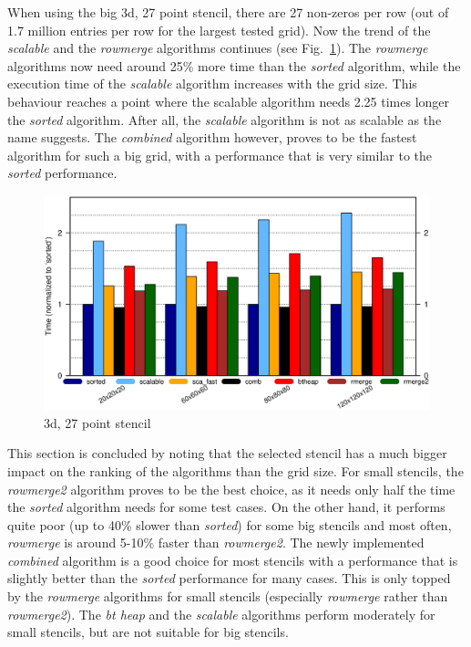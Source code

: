 When using the big 3d, 27 point stencil, there are 27 non-zeros per row (out of 1.7 million entries per row for the largest tested grid). Now the trend of the \textit{scalable} and the \textit{rowmerge} algorithms continues (see Fig.~\ref{fig:seq3d27point}). The \textit{rowmerge} algorithms now need around 25\% more time than the \textit{sorted} algorithm, while the execution time of the \textit{scalable} algorithm increases with the grid size. This behaviour reaches a point where the scalable algorithm needs 2.25 times longer the \textit{sorted} algorithm. After all, the \textit{scalable} algorithm is not as scalable as the name suggests. The \textit{combined} algorithm however, proves to be the fastest algorithm for such a big grid, with a performance that is very similar to the \textit{sorted} performance. 

\begin{figure}[tbp]
	\centering
	\includegraphics[width=1.05\textwidth, trim={0 7.3cm 0 1cm},clip]{seq_3d27point}
	\caption{3d, 27 point stencil} 
	\label{fig:seq3d27point}
\end{figure}

This section is concluded by noting that the selected stencil has a much bigger impact on the ranking of the algorithms than the grid size. For small stencils, the \textit{rowmerge2} algorithm proves to be the best choice, as it needs only half the time the \textit{sorted} algorithm needs for some test cases. On the other hand, it performs quite poor (up to 40\% slower than \textit{sorted}) for some big stencils and most often, \textit{rowmerge} is around 5-10\% faster than \textit{rowmerge2}. The newly implemented \textit{combined} algorithm is a good choice for most stencils with a performance that is slightly better than the \textit{sorted} performance for many cases. This is only topped by the \textit{rowmerge} algorithms for small stencils (especially \textit{rowmerge} rather than \textit{rowmerge2}). The \textit{bt heap} and the \textit{scalable} algorithms perform moderately for small stencils, but are not suitable for big stencils.

